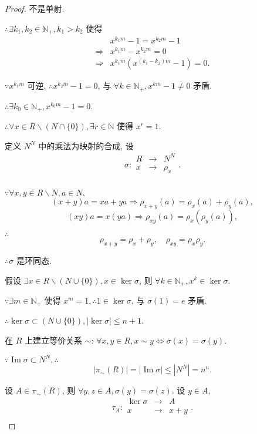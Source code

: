 \documentclass{ctexart}
\begin{document}
\begin{proof}
    不是单射.

    $\therefore\exists k_1,k_2\in\mathbb{N}_+,k_1>k_2$ 使得
    \begin{align*}
        & x^{k_1m}-1=x^{k_2m}-1 \\
        \Rightarrow & x^{k_1m}-x^{k_2m}=0 \\
        \Rightarrow & x^{k_1m}(x^{(k_1-k_2)m}-1)=0.
    \end{align*}

    $\because x^{k_1m}$ 可逆, $\therefore x^{k_2m}-1=0$, 与 $\forall k\in\mathbb{N}_+,x^{km}-1\neq0$ 矛盾.

    $\therefore\exists k_0\in\mathbb{N}_+,x^{k_0m}-1=0$.

    $\therefore\forall x\in R\backslash(N\cap\{0\}),\exists r\in\mathbb{N}$ 使得 $x^r=1$.

    定义 $N^N$ 中的乘法为映射的合成, 设
    \[\sigma:\begin{array}{rcl}
        R & \to & N^N \\
        x & \to & \rho_x \\
    \end{array}.\]

    $\because\forall x,y\in R\backslash N,a\in N$,
    \[(x+y)a=xa+ya\Rightarrow\rho_{x+y}(a)=\rho_x(a)+\rho_y(a),\]
    \[(xy)a=x(ya)\Rightarrow\rho_{xy}(a)=\rho_x(\rho_y(a)),\]

    $\therefore$
    \[\rho_{x+y}=\rho_x+\rho_y,\quad\rho_{xy}=\rho_x\rho_y.\]

    $\therefore\sigma$ 是环同态.

    假设 $\exists x\in R\backslash(N\cup\{0\}),x\in\ker\sigma$, 则 $\forall k\in\mathbb{N}_+,x^k\in\ker\sigma$.

    $\because\exists m\in\mathbb{N}_+$ 使得 $x^m=1,\therefore1\in\ker\sigma$, 与 $\sigma(1)=e$ 矛盾.

    $\therefore\ker\sigma\subset(N\cup\{0\}),|\ker\sigma|\leq n+1$.

    在 $R$ 上建立等价关系 $\sim$: $\forall x,y\in R,x\sim y\Leftrightarrow\sigma(x)=\sigma(y)$.

    $\because\operatorname{Im}\sigma\subset N^N,\therefore$
    \[|\pi_\sim(R)|=|\operatorname{Im}\sigma|\leq|N^N|=n^n.\]

    设 $A\in\pi_\sim(R)$, 则 $\forall y,z\in A,\sigma(y)=\sigma(z)$. 设 $y\in A$, 
    \[\tau_A:\begin{array}{rcl}
        \ker\sigma & \to & A \\
        x & \to & x+y \\
    \end{array}.\]


\end{proof}
\end{document}
